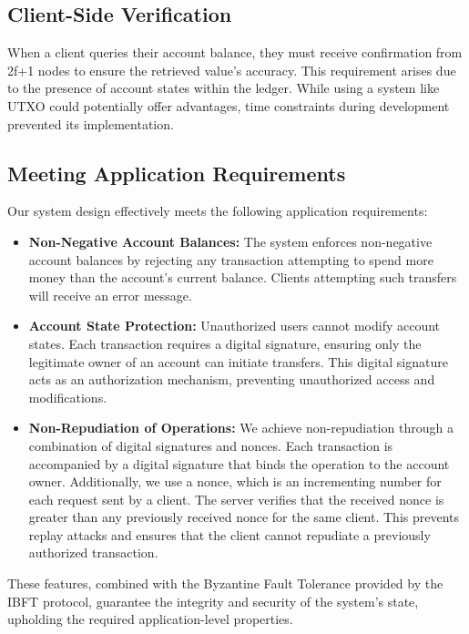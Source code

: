 \subsection{Client-Side Verification}
When a client queries their account balance, they must receive confirmation from 2f+1 nodes to ensure the retrieved value's accuracy. This requirement arises due to the presence of account states within the ledger. While using a system like UTXO could potentially offer advantages, time constraints during development prevented its implementation.

\subsection{Meeting Application Requirements}

Our system design effectively meets the following application requirements:

\begin{itemize}
\item \textbf{Non-Negative Account Balances:} The system enforces non-negative account balances by rejecting any transaction attempting to spend more money than the account's current balance. Clients attempting such transfers will receive an error message.

\item \textbf{Account State Protection:} Unauthorized users cannot modify account states. Each transaction requires a digital signature, ensuring only the legitimate owner of an account can initiate transfers. This digital signature acts as an authorization mechanism, preventing unauthorized access and modifications.

\item \textbf{Non-Repudiation of Operations:} We achieve non-repudiation through a combination of digital signatures and nonces. Each transaction is accompanied by a digital signature that binds the operation to the account owner. Additionally, we use a nonce, which is an incrementing number for each request sent by a client. The server verifies that the received nonce is greater than any previously received nonce for the same client. This prevents replay attacks and ensures that the client cannot repudiate a previously authorized transaction.
\end{itemize}

These features, combined with the Byzantine Fault Tolerance provided by the IBFT protocol, guarantee the integrity and security of the system's state, upholding the required application-level properties.

